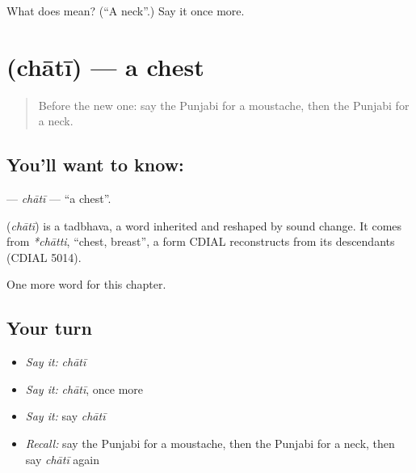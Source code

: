 \begin{tcolorbox}[breakable,colback=teal!4,colframe=teal!35!black,title={Before you move on}]
What does  mean? (\textquotedblleft{}A neck\textquotedblright{}.) Say it once more.
\end{tcolorbox}
\section[\texorpdfstring{\pa{ਛਾਤੀ} (chātī)}{ਛਾਤੀ (chātī)}]{ (chātī) — a chest}

\label{lesson:PA-C135-chati}



\begin{quote}
Before the new one: say the Punjabi for a moustache, then the Punjabi for a neck.
\end{quote}

\subsection*{You'll want to know: }
\textbf{} — \emph{chātī} — \textquotedblleft{}a chest\textquotedblright{}.

\begin{cousinweb}
\textbf{} (\emph{chātī}) is a tadbhava, a word inherited and reshaped by sound change. It comes from \emph{*chātti}, \textquotedblleft{}chest, breast\textquotedblright{}, a form CDIAL reconstructs from its descendants (CDIAL 5014).
\end{cousinweb}

\begin{grammarlens}[title={What you've built}]
One more word for this chapter.
\end{grammarlens}

\subsection*{Your turn}
\begin{itemize}
\raggedright
  \item \emph{Say it:} \emph{chātī}
  \item \emph{Say it:} \emph{chātī}, once more
  \item \emph{Say it:} say \emph{chātī}
  \item \emph{Recall:} say the Punjabi for a moustache, then the Punjabi for a neck, then say \emph{chātī} again
\end{itemize}

